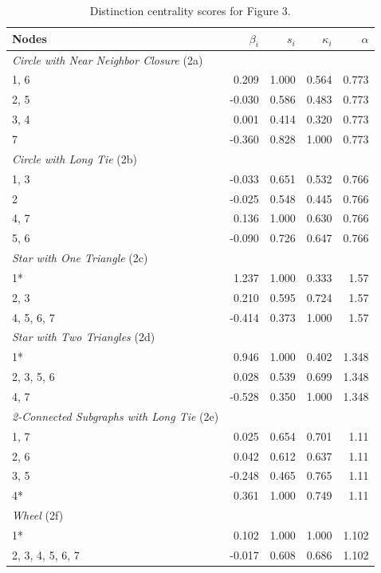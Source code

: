 \begin{table}
\footnotesize
\centering
\caption{\label{tab:figure3}Distinction centrality scores for Figure 3.}
\centering
\begin{tabular}[t]{lrrrr}
Nodes & $\beta_i$ & $s_i$ & $\kappa_i$ & $\alpha$\\
\toprule
\midrule
\textit{Circle with Near Neighbor Closure} (2a)\\
1, 6 & 0.209 & 1.000 & 0.564 & 0.773\\
2, 5 & -0.030 & 0.586 & 0.483 & 0.773\\
3, 4 & 0.001 & 0.414 & 0.320 & 0.773\\
7 & -0.360 & 0.828 & 1.000 & 0.773\\
\midrule
\midrule
\textit{Circle with Long Tie} (2b)\\
1, 3 & -0.033 & 0.651 & 0.532 & 0.766\\
2 & -0.025 & 0.548 & 0.445 & 0.766\\
4, 7 & 0.136 & 1.000 & 0.630 & 0.766\\
5, 6 & -0.090 & 0.726 & 0.647 & 0.766\\
\midrule
\midrule
\textit{Star with One Triangle} (2c)\\
1* & 1.237 & 1.000 & 0.333 & 1.57\\
2, 3 & 0.210 & 0.595 & 0.724 & 1.57\\
4, 5, 6, 7 & -0.414 & 0.373 & 1.000 & 1.57\\
\midrule
\midrule
\textit{Star with Two Triangles} (2d)\\
1* & 0.946 & 1.000 & 0.402 & 1.348\\
2, 3, 5, 6 & 0.028 & 0.539 & 0.699 & 1.348\\
4, 7 & -0.528 & 0.350 & 1.000 & 1.348\\
\midrule
\midrule
\textit{2-Connected Subgraphs with Long Tie} (2e)\\
1, 7 & 0.025 & 0.654 & 0.701 & 1.11\\
2, 6 & 0.042 & 0.612 & 0.637 & 1.11\\
3, 5 & -0.248 & 0.465 & 0.765 & 1.11\\
4* & 0.361 & 1.000 & 0.749 & 1.11\\
\midrule
\midrule
\textit{Wheel} (2f)\\
1* & 0.102 & 1.000 & 1.000 & 1.102\\
2, 3, 4, 5, 6, 7 & -0.017 & 0.608 & 0.686 & 1.102\\
\bottomrule
\bottomrule
\end{tabular}
\end{table}
